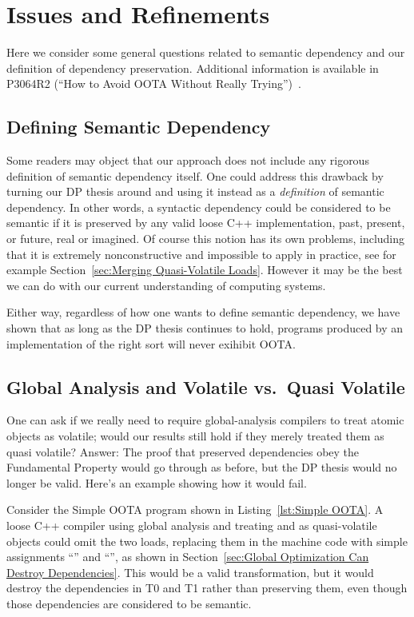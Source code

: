 \section{Issues and Refinements}
\label{sec:Issues and Refinements}

Here we consider some general questions related to semantic dependency
and our definition of dependency preservation.
Additional information is available in P3064R2 (``How to Avoid OOTA Without
Really Trying'')~\cite{PaulEMcKenney2023P3046R2/OOTAwithoutTrying}.

\subsection{Defining Semantic Dependency}
\label{sec:Defining Semantic Dependency}

Some readers may object that our approach does not include any
rigorous definition of semantic dependency itself.
One could address this drawback by turning our DP thesis around
and using it instead as a \emph{definition} of semantic dependency.
In other words, a syntactic dependency could be considered to be semantic
if it is preserved by any valid loose C++
implementation, past, present, or future, real or imagined.
Of course this notion has its own problems, including that it is
extremely nonconstructive and impossible to apply in practice,
see for example
Section~\ref{sec:Merging Quasi-Volatile Loads}.
However it may be the best we can do with our current understanding
of computing systems.

Either way, regardless of how one wants to define semantic dependency,
we have shown that as long as the DP thesis continues to hold,
programs produced by an implementation of the right sort will never
exihibit OOTA.

\subsection{Global Analysis and Volatile vs.\ Quasi Volatile}
\label{sec:Global Analysis and Volatile vs. Quasi Volatile}

One can ask if we really need to require global-analysis compilers to
treat atomic objects as volatile; would our results still hold if they
merely treated them as quasi volatile?
Answer: The proof that preserved dependencies obey the Fundamental Property
would go through as before,
but the DP thesis would no longer be valid.
Here's an example showing how it would fail.

Consider the Simple OOTA program shown in
Listing~\ref{lst:Simple OOTA}.
A loose C++ compiler using global analysis and treating  and  as
quasi-volatile objects could omit the two loads, replacing them in the
machine code with simple assignments ``'' and
``'', as shown in
Section~\ref{sec:Global Optimization Can Destroy Dependencies}.
This would be a valid transformation,
but it would destroy the dependencies in T0 and T1 rather than preserving them,
even though those dependencies are considered to be semantic.

